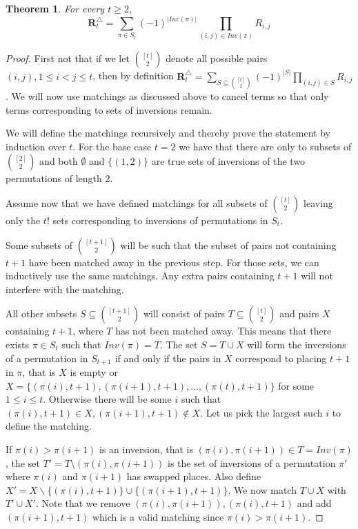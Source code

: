 \documentclass[11pt]{amsart}
\newtheorem{theorem}{Theorem}[section]
\begin{document}
\begin{theorem}\label{thm:inversions} For every $t\ge 2$,
    \[\mathbf{R}^\triangle_t=\sum_{\pi\in S_{t}} (-1)^{|Inv(\pi)|}\prod_{(i,j)\in Inv(\pi)} R_{i,j}
    \]
\end{theorem}
\begin{proof}
First not that if we let $\binom{[t]}{2}$ denote all possible pairs $(i,j), 1\le i<j\le t$, then by definition 
$\mathbf{R}^\triangle_t=\sum_{S\subseteq \binom{[t]}{2}} (-1)^{|S|}\prod_{(i,j)\in S} R_{i,j}$.
We will now use matchings as discussed above to cancel terms so that only terms corresponding to sets of inversions remain.

We will define the matchings recursively and thereby prove the statement by induction over $t$.
For the base case $t=2$ we have that there are only to subsets of $\binom{[2]}{2}$ and both $\emptyset $ and $\{(1,2)\}$ are true sets of inversions of the two permutations of length 2.

Assume now that we have defined matchings for all subsets of $\binom{[t]}{2}$ leaving only the $t!$ sets corresponding to inversions of permutations in $S_t$. 

Some subsets of $\binom{[t+1]}{2}$ will be such that the subset of pairs not containing $t+1$ have been matched away in the previous step. For those sets, we can inductively use the same matchings. Any extra pairs containing   $t+1$ will not interfere with the matching.

All other subsets $S\subseteq \binom{[t+1]}{2}$ will consist of pairs $T\subseteq \binom{[t]}{2}$ and pairs $X$ containing $t+1$, where $T$ has not been matched away. This means that there exists $\pi\in S_t$ such that $Inv(\pi)=T$.  The set  $S=T\cup X$ will form the inversions of a permutation in $S_{t+1}$ if and only if the pairs in $X$ correspond to placing $t+1$ in $\pi$, that is $X$ is empty or $X=\{(\pi(i),t+1),(\pi(i+1),t+1),\ldots,(\pi(t),t+1)\}$ for some $1\le i\le t$.
Otherwise there will be some $i$ such that $(\pi(i),t+1)\in X, (\pi(i+1),t+1)\notin X$. Let us pick the largest such $i$ to define the matching.

If $\pi(i)> \pi(i+1)$ is an inversion, that is $(\pi(i),\pi(i+1))\in T=Inv(\pi)$, the set $T'=T\setminus (\pi(i),\pi(i+1)) $ is the set of inversions of a permutation $\pi'$ where $\pi(i)$ and $\pi(i+1)$ has swapped places. Also define $X'=X\backslash \{(\pi(i),t+1)\}\cup \{(\pi(i+1),t+1)\}$. We now match $T\cup X$ with $T' \cup X'$.  Note that we remove $ (\pi(i),\pi(i+1)),(\pi(i),t+1)$ and add $(\pi(i+1),t+1)$ which is a valid matching since $\pi(i)> \pi(i+1)$. 


\end{proof}
\end{document}
